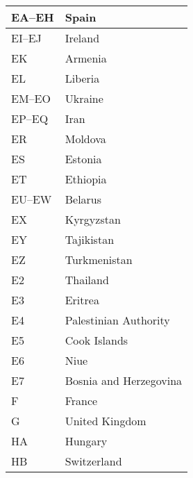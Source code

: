 \begin{longtable}{|l|l|}
  EA--EH              & Spain                                     \\
  \hline
  EI--EJ              & Ireland                                   \\
  \hline
  EK                  & Armenia                                   \\
  \hline
  EL                  & Liberia                                   \\
  \hline
  EM--EO              & Ukraine                                   \\
  \hline
  EP--EQ              & Iran                                      \\
  \hline
  ER                  & Moldova                                   \\
  \hline
  ES                  & Estonia                                   \\
  \hline
  ET                  & Ethiopia                                  \\
  \hline
  EU--EW              & Belarus                                   \\
  \hline
  EX                  & Kyrgyzstan                                \\
  \hline
  EY                  & Tajikistan                                \\
  \hline
  EZ                  & Turkmenistan                              \\
  \hline
  E2                  & Thailand                                  \\
  \hline
  E3                  & Eritrea                                   \\
  \hline
  E4                  & Palestinian Authority                     \\
  \hline
  E5                  & Cook Islands                              \\
  \hline
  E6                  & Niue                                      \\
  \hline
  E7                  & Bosnia and Herzegovina                    \\
  \hline
  F                   & France                                    \\
  \hline
  G                   & United Kingdom                            \\
  \hline
  HA                  & Hungary                                   \\
  \hline
  HB                  & Switzerland                               \\

\end{longtable}
